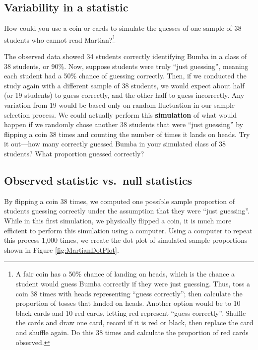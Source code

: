 \documentclass[
  10pt,
  openany]{book}
\theoremstyle{definition}
\theoremstyle{definition}
\theoremstyle{definition}
\theoremstyle{definition}
\theoremstyle{remark}
\begin{document}
\subsection{Variability in a statistic}\label{variability-in-a-statistic}

How could you use a coin or cards to simulate the guesses of one sample of 38 students who cannot read Martian?\footnote{A fair coin has a 50\% chance of landing on heads, which is the chance a student would guess Bumba correctly if they were just guessing. Thus, toss a coin 38 times with heads representing ``guess correctly''; then calculate the proportion of tosses that landed on heads. Another option would be to 10 black cards and 10 red cards, letting red represent ``guess correctly''. Shuffle the cards and draw one card, record if it is red or black, then replace the card and shuffle again. Do this 38 times and calculate the proportion of red cards observed.}

The observed data showed 34 students correctly identifying Bumba in a class of 38 students, or 90\%. Now, suppose students were truly ``just guessing'', meaning each student had a 50\% chance of guessing correctly. Then, if we conducted the study again with a different sample of 38 students, we would expect about half (or 19 students) to guess correctly, and the other half to guess incorrectly. Any variation from 19 would be based only on random fluctuation in our sample selection process. We could actually perform this \textbf{simulation} of what would happen if we randomly chose another 38 students that were ``just guessing'' by flipping a coin 38 times and counting the number of times it lands on heads. Try it out---how many correctly guessed Bumba in your simulated class of 38 students? What proportion guessed correctly?

\subsection{Observed statistic vs.~null statistics}\label{observed-statistic-vs.-null-statistics}

By flipping a coin 38 times, we computed one possible sample proportion of students guessing correctly under the assumption that they were ``just guessing''.
While in this first simulation, we physically flipped a coin, it is much more efficient to perform this simulation using a computer.
Using a computer to repeat this process 1,000 times, we create the dot plot of simulated sample proportions shown in Figure \ref{fig:MartianDotPlot}.
\end{document}
